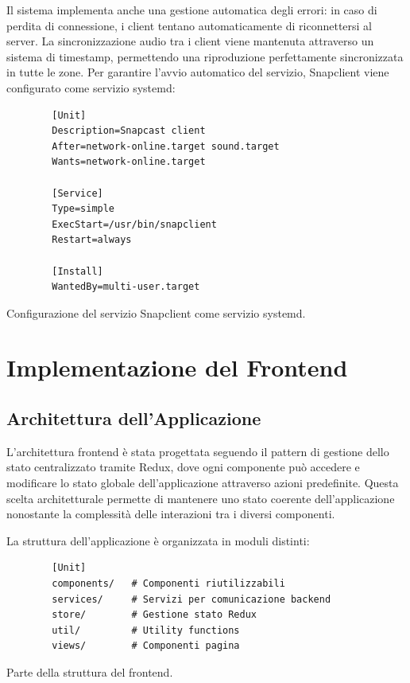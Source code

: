 Il sistema implementa anche una gestione automatica degli errori: in caso di perdita di connessione, i client tentano automaticamente di riconnettersi al server. La sincronizzazione audio tra i client viene mantenuta attraverso un sistema di timestamp, permettendo una riproduzione perfettamente sincronizzata in tutte le zone.
Per garantire l'avvio automatico del servizio, Snapclient viene configurato come servizio systemd:

\begin{table}[H]
    \centering
    \begin{minipage}{0.7\textwidth}
      \begin{verbatim}
        [Unit]
        Description=Snapcast client
        After=network-online.target sound.target
        Wants=network-online.target
  
        [Service]
        Type=simple
        ExecStart=/usr/bin/snapclient
        Restart=always
  
        [Install]
        WantedBy=multi-user.target
      \end{verbatim}
    \end{minipage}
    \caption{Configurazione del servizio Snapclient come servizio systemd.}
    \label{tab:snapclient_service}
  \end{table}

\newpage
\section{Implementazione del Frontend}
\noindent


\subsection{Architettura dell'Applicazione}

L'architettura frontend è stata progettata seguendo il pattern di gestione dello stato centralizzato tramite Redux, dove ogni componente può accedere e modificare lo stato globale dell'applicazione attraverso azioni predefinite. Questa scelta architetturale permette di mantenere uno stato coerente dell'applicazione nonostante la complessità delle interazioni tra i diversi componenti.

La struttura dell'applicazione è organizzata in moduli distinti:

\begin{table}[H]
    \begin{minipage}{0.6\textwidth}
      \begin{verbatim}
        [Unit]
        components/   # Componenti riutilizzabili
        services/     # Servizi per comunicazione backend
        store/        # Gestione stato Redux
        util/         # Utility functions
        views/        # Componenti pagina
      \end{verbatim}
    \end{minipage}
    \caption{Parte della struttura del frontend.}
    \label{tab:frontend_struttura}
  \end{table}

